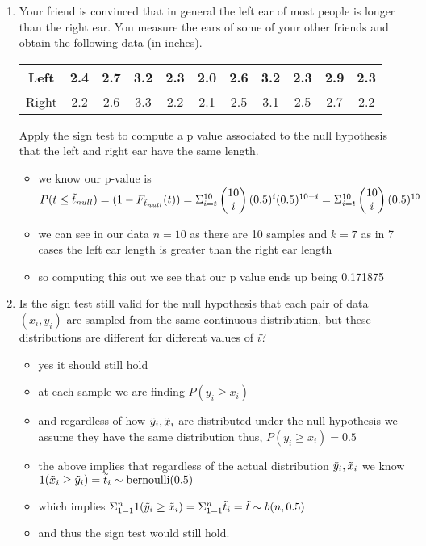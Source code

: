 \documentclass[12pt,twoside]{article}
\begin{document}
\begin{enumerate}
\begin{enumerate}
\item Your friend is convinced that in general the left ear of most people is longer than the right ear. You measure the ears of some of your other friends and obtain the following data (in inches).
\renewcommand{\arraystretch}{1.5}
\begin{center}
\begin{tabular}{ | c | c | c | c | c | c | c | c | c | c | c |  } %
  \hline			
Left  & 2.4 & 2.7 & 3.2 & 2.3 & 2.0 & 2.6 & 3.2 & 2.3 & 2.9 & 2.3  \\
  \hline			
 Right  &  2.2 & 2.6 & 3.3 & 2.2 & 2.1 & 2.5 & 3.1 & 2.5 & 2.7 & 2.2  \\
  \hline  
 \end{tabular}
\end{center} 
Apply the sign test to compute a p value associated to the null hypothesis that the left and right ear have the same length. 
\begin{itemize}
  \color{blue}
  \item we know our p-value is $P(t\leq \Tilde{t}_{null})=(1-F_{\Tilde{t}_{null}}(t))=\Sigma_{i=t}^{10}\begin{pmatrix}
    10\\i
  \end{pmatrix}(0.5)^{i}(0.5)^{10-i}=\Sigma_{i=t}^{10}\begin{pmatrix}
    10\\i
  \end{pmatrix}(0.5)^{10}$
  \item we can see in our data $n=10$ as there are 10 samples and $k=7$ as in 7 cases the left ear length is greater than the right ear length
  \item so computing this out we see that our p value ends up being 0.171875
\end{itemize}

\item Is the sign test still valid for the null hypothesis that each pair of data $(x_i,y_i)$ are sampled from the same continuous distribution, but these distributions are different for different values of $i$?   
\begin{itemize}
  \color{blue}
  \item yes it should still hold
  \item at each sample we are finding $P(y_i\geq x_i)$
  \item and regardless of how $\Tilde{y}_i,\tilde{x}_i$ are distributed under the null hypothesis we assume they have the same distribution thus, $P(y_i\geq x_i)=0.5$ 
  \item the above implies that regardless of the actual distribution  $\Tilde{y}_i,\tilde{x}_i$ we know $1(\tilde{x}_i\geq \Tilde{y}_i)=\tilde{t}_i\sim \text{bernoulli}(0.5)$
  \item which implies $\Sigma_{1=1}^{n}1(\Tilde{y}_i\geq \tilde{x}_i)=\Sigma_{1=1}^{n}\tilde{t}_i=\tilde{t}\sim b(n,0.5)$
  \item and thus the sign test would still hold. 
\end{itemize}
\newpage
\end{enumerate}


\end{enumerate}
\end{document}
